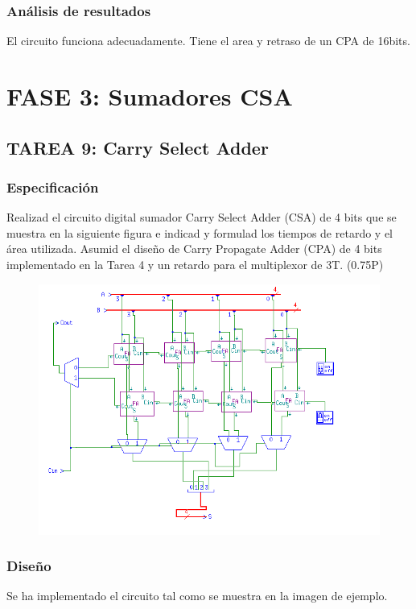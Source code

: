 \documentclass{article}
\begin{document}
		\subsubsection*{Análisis de resultados}
		El circuito funciona adecuadamente. Tiene el area y retraso de un CPA de 16bits.

\section{FASE 3: Sumadores CSA}
	\subsection{TAREA 9: Carry Select Adder}
		\subsubsection*{Especificación}
		Realizad el circuito digital sumador Carry Select Adder (CSA) de 4 bits que se muestra
		en la siguiente figura e indicad y formulad los tiempos de retardo y el área utilizada. Asumid el
		diseño de Carry Propagate Adder (CPA) de 4 bits implementado en la Tarea 4 y un retardo para el
		multiplexor de 3T. (0.75P)

		\begin{figure}[ht]
			\includegraphics[width=0.8\linewidth]{CSA}
			\centering
		\end{figure}


		\subsubsection*{Diseño}
		Se ha implementado el circuito tal como se muestra en la imagen de ejemplo.
\end{document}
